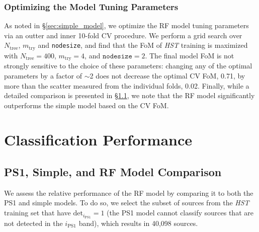\documentclass[twocolumn, dvipdfmx]{aastex62}
\begin{document}
\subsubsection{Optimizing the Model Tuning Parameters}

As noted in \S\ref{sec:simple_model}, we optimize the RF model tuning
parameters via an outter and inner 10-fold CV procedure. We perform a grid
search over $N_{\mathrm{tree}}$, $m_{\mathrm{try}}$ and \texttt{nodesize},
and find that the FoM of \textit{HST} training is maximized with
$N_{\mathrm{tree}} = 400$, $m_{\mathrm{try}} = 4$, and $\mathtt{nodesize} =
2$. The final model FoM is not strongly sensitive to the choice of these
parameters: changing any of the optimal parameters by a factor of $\sim$2
does not decrease the optimal CV FoM, 0.71, by more than the scatter
measured from the individual folds, 0.02. Finally, while a detailed
comparison is presented in \S\ref{sec:comp_hst}, we note that the RF model
significantly outperforms the simple model based on the CV FoM.

\section{Classification Performance}

\subsection{PS1, Simple, and RF Model Comparison}\label{sec:comp_hst}

We assess the relative performance of the RF model by comparing it to both
the PS1 and simple models. To do so, we select the subset of sources from
the \textit{HST} training set that have $\mathrm{det}_{i_\mathrm{PS1}} = 1$
(the PS1 model cannot classify sources that are not detected in the
$i_\mathrm{PS1}$ band), which results in 40,098 sources.
\end{document}
